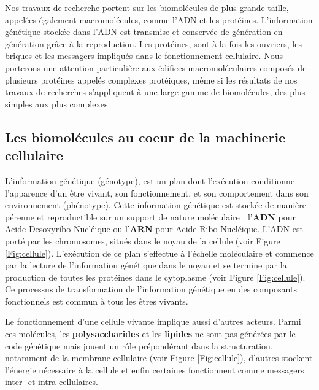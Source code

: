 Nos travaux de recherche portent sur les biomolécules de plus grande taille, appelées également macromolécules, comme l'ADN et les protéines. L'information génétique stockée dans l'ADN est transmise et conservée de génération en génération grâce à la reproduction. Les protéines, sont à la fois les ouvriers, les briques et les messagers impliqués dans le fonctionnement cellulaire. Nous porterons une attention particulière aux édifices macromoléculaires composés de plusieurs protéines appelés complexes protéiques, même si les résultats de nos travaux de recherches s'appliquent à une large gamme de biomolécules, des plus simples aux plus complexes.

\subsection{Les biomolécules au coeur de la machinerie cellulaire}

L'information génétique (génotype), est un plan dont l'exécution conditionne l'apparence d'un être vivant, son fonctionnement, et son comportement dans son environnement (phénotype). Cette information génétique est stockée de manière pérenne et reproductible sur un support de nature moléculaire : l'\textbf{ADN} pour Acide Desoxyribo-Nucléique ou l'\textbf{ARN} pour Acide Ribo-Nucléique. L'ADN est porté par les chromosomes, situés dans le noyau de la cellule (voir Figure \ref{Fig:cellule}).
L'exécution de ce plan s'effectue à l'échelle moléculaire et commence par la lecture de l'information génétique dans le noyau et se termine par la production de toutes les protéines dans le cytoplasme (voir Figure \ref{Fig:cellule}). Ce processus de transformation de l'information génétique en des composants fonctionnels est commun à tous les êtres vivants.

Le fonctionnement d'une cellule vivante implique aussi d'autres acteurs. Parmi ces molécules, les \textbf{polysaccharides}  et les \textbf{lipides}  ne sont pas générées par le code génétique mais jouent un rôle prépondérant dans la structuration, notamment de la membrane cellulaire (voir Figure \ref{Fig:cellule}), d'autres stockent l'énergie nécessaire à la cellule et enfin certaines fonctionnent comme messagers inter- et intra-cellulaires.


